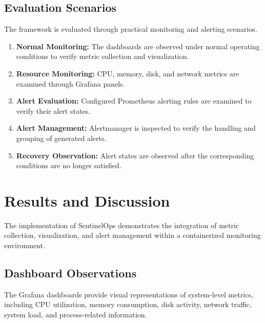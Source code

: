 \documentclass[conference]{IEEEtran}
\begin{document}
\subsection{Evaluation Scenarios}

The framework is evaluated through practical monitoring
and alerting scenarios.

\begin{enumerate}
    \item \textbf{Normal Monitoring:} The dashboards are
    observed under normal operating conditions to verify
    metric collection and visualization.

    \item \textbf{Resource Monitoring:} CPU, memory, disk,
    and network metrics are examined through Grafana panels.

    \item \textbf{Alert Evaluation:} Configured Prometheus
    alerting rules are examined to verify their alert states.

    \item \textbf{Alert Management:} Alertmanager is inspected
    to verify the handling and grouping of generated alerts.

    \item \textbf{Recovery Observation:} Alert states are
    observed after the corresponding conditions are no
    longer satisfied.
\end{enumerate}


\section{Results and Discussion}

The implementation of SentinelOps demonstrates the integration
of metric collection, visualization, and alert management
within a containerized monitoring environment.

\subsection{Dashboard Observations}

The Grafana dashboards provide visual representations of
system-level metrics, including CPU utilization, memory
consumption, disk activity, network traffic, system load,
and process-related information.
\end{document}
